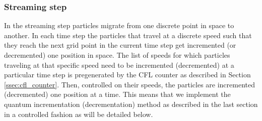 





\subsubsection{Streaming step}\label{ssec:convection step}
In the streaming step particles migrate from one discrete point in space to another. 
In each time step the particles that travel at a discrete speed such that they reach the next grid point in the current time step get incremented (or decremented) one position in space. The list of speeds for which particles traveling at that specific speed need to be incremented (decremented) at a particular time step is pregenerated by the CFL counter as described in Section \ref{ssec:cfl_counter}. Then, controlled on their speeds, the particles are incremented (decremented) one position at a time. This means that we implement the quantum incrementation (decrementation) method as described in the last section in a controlled fashion as will be detailed below.  \\

